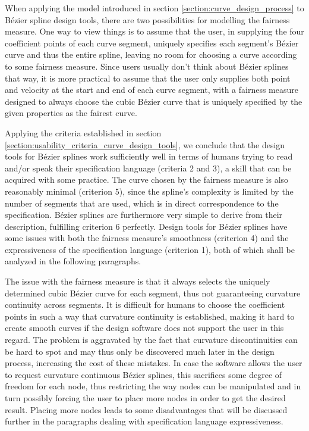 \documentclass[a4paper]{article}
\begin{document}
				When applying the model introduced in section \ref{section:curve_design_process} to Bézier spline design tools, there are two possibilities for modelling the fairness measure. One way to view things is to assume that the user, in supplying the four coefficient points of each curve segment, uniquely specifies each segment's Bézier curve and thus the entire spline, leaving no room for choosing a curve according to some fairness measure. Since users usually don't think about Bézier splines that way, it is more practical to assume that the user only supplies both point and velocity at the start and end of each curve segment, with a fairness measure designed to always choose the cubic Bézier curve that is uniquely specified by the given properties as the fairest curve.

				Applying the criteria established in section \ref{section:usability_criteria_curve_design_tools}, we conclude that the design tools for Bézier splines work sufficiently well in terms of humans trying to read and/or speak their specification language (criteria 2 and 3), a skill that can be acquired with some practice. The curve chosen by the fairness measure is also reasonably minimal (criterion 5), since the spline's complexity is limited by the number of segments that are used, which is in direct correspondence to the specification. Bézier splines are furthermore very simple to derive from their description, fulfilling criterion 6 perfectly. Design tools for Bézier splines have some issues with both the fairness measure's smoothness (criterion 4) and the expressiveness of the specification language (criterion 1), both of which shall be analyzed in the following paragraphs.

				The issue with the fairness measure is that it always selects the uniquely determined cubic Bézier curve for each segment, thus not guaranteeing curvature continuity across segments. It is difficult for humans to choose the coefficient points in such a way that curvature continuity is established, making it hard to create smooth curves if the design software does not support the user in this regard. The problem is aggravated by the fact that curvature discontinuities can be hard to spot and may thus only be discovered much later in the design process, increasing the cost of these mistakes. In case the software allows the user to request curvature continuous Bézier splines, this sacrifices some degree of freedom for each node, thus restricting the way nodes can be manipulated and in turn possibly forcing the user to place more nodes in order to get the desired result. Placing more nodes leads to some disadvantages that will be discussed further in the paragraphs dealing with specification language expressiveness.
\end{document}
